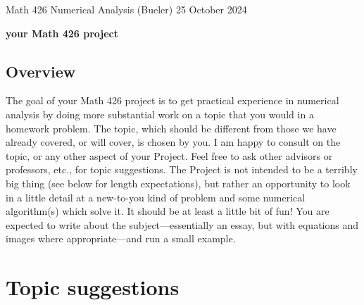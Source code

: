 \documentclass[11pt]{amsart}
\begin{document}
\scriptsize \noindent Math 426 Numerical Analysis (Bueler) \hfill 25 October 2024
\bigskip

\Large\centerline{\textbf{your Math 426 project}}
\normalsize

\thispagestyle{empty}

\bigskip

\subsection*{Overview}  The goal of your Math 426 project is to get practical experience in numerical analysis by doing more substantial work on a topic that you would in a homework problem.  The topic, which should be different from those we have already covered, or will cover, is chosen by you.  I am happy to consult on the topic, or any other aspect of your Project.  Feel free to ask other advisors or professors, etc., for topic suggestions.  The Project is not intended to be a terribly big thing (see below for length expectations), but rather an opportunity to look in a little detail at a new-to-you kind of problem and some numerical algorithm(s) which solve it.  It should be at least a little bit of fun!  You are expected to write about the subject---essentially an essay, but with equations and images where appropriate---and run a small example.

\section*{Topic suggestions}
\end{document}

